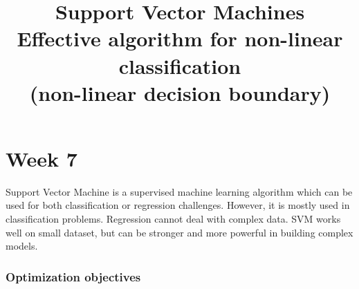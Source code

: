 \documentclass[a4paper,12pt]{report}
\begin{document}
\tableofcontents

\title{Support Vector Machines \\ Effective algorithm for non-linear classification \\ (non-linear decision boundary)}
\maketitle
\part{Week 7}
Support Vector Machine is a supervised machine learning algorithm which can be used for both classification or regression challenges. However, it is mostly used in classification problems. Regression cannot deal with complex data. SVM works well on small dataset, but can be stronger and more powerful in building complex models.
\section{Optimization objectives}
\end{document}
